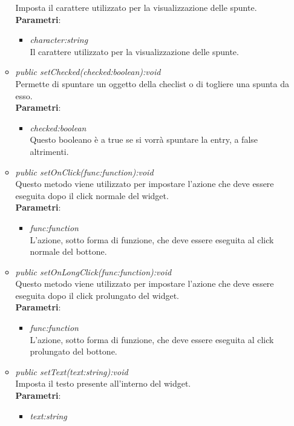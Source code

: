 \begin{itemize}
\begin{itemize}
	Imposta il carattere utilizzato per la visualizzazione delle spunte.
		\\ \textbf{Parametri}: \begin{itemize}
		\item \textit{character:string}\\
		Il carattere utilizzato per la visualizzazione delle spunte.
		\end{itemize} 
	\item \textit{public setChecked(checked:boolean):void}\\
	Permette di spuntare un oggetto della checlist o di togliere una spunta da esso.
		\\ \textbf{Parametri}: \begin{itemize}
		\item \textit{checked:boolean}\\
		Questo booleano è a true se si vorrà spuntare la entry, a false altrimenti.
		\end{itemize}  
	\item \textit{public setOnClick(func:function):void}\\
	Questo metodo viene utilizzato per impostare l'azione che deve essere eseguita dopo il click normale del widget.
		\\ \textbf{Parametri}: \begin{itemize}
		\item \textit{func:function}\\
		L'azione, sotto forma di funzione, che deve essere eseguita al click normale del bottone.
		\end{itemize}
	\item \textit{public setOnLongClick(func:function):void}\\
		Questo metodo viene utilizzato per impostare l'azione che deve essere eseguita dopo il click prolungato del widget.
		\\ \textbf{Parametri}: \begin{itemize}
		\item \textit{func:function}\\
		L'azione, sotto forma di funzione, che deve essere eseguita al click prolungato del bottone.
		\end{itemize}
	\item \textit{public setText(text:string):void}\\
	Imposta il testo presente all'interno del widget.
		\\ \textbf{Parametri}: \begin{itemize}
		\item \textit{text:string}\\

\end{itemize}
\end{itemize}
\end{itemize}
